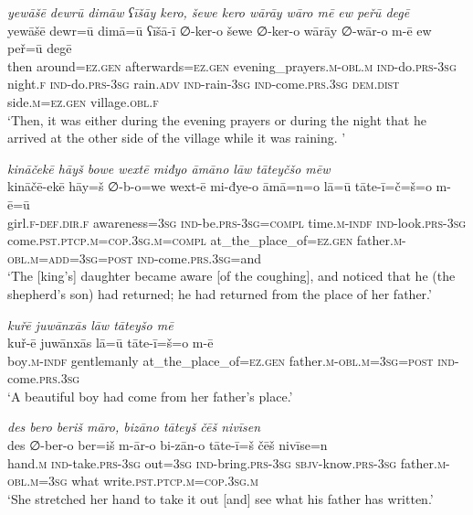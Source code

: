 \ea \label{KŠ.59}
\textit{yewāšē dewrū dimāw ʕīšāy kero, šewe kero wārāy wāro mē ew peřū degē} \\ 
\gll yewāšē dewr=ū dimā=ū ʕīšā-ī ∅-ker-o šewe ∅-ker-o wārāy ∅-wār-o m-ē ew peř=ū degē \\ 
 then around\textsc{\textsc{=ez.gen}} afterwards\textsc{\textsc{=ez.gen}} evening\_prayers\textsc{.m}\textsc{-obl}\textsc{.m} \textsc{ind-}do\textsc{.prs}\textsc{-3sg} night\textsc{.f} \textsc{ind-}do\textsc{.prs}\textsc{-3sg} rain\textsc{.adv} \textsc{ind-}rain\textsc{-3sg} \textsc{ind-}come\textsc{.prs}\textsc{.3sg} \textsc{dem.dist} side\textsc{.m}\textsc{\textsc{=ez.gen}} village\textsc{.obl}\textsc{.f} \\ 
\glt `Then, it was either during the evening prayers or during the night that he arrived at the other side of the village while it was raining. '
\z 
 
\ea \label{KŠ.65}
\textit{kināčekē hāyš bowe wextē miđyo āmāno lāw tāteyčšo mēw} \\ 
\gll kināčē-ekē hāy=š ∅-b-o=we wext-ē mi-đye-o āmā=n=o lā=ū tāte-ī=č=š=o m-ē=ū \\ 
 girl\textsc{.f}\textsc{-def}\textsc{.dir}\textsc{.f} awareness\textsc{=3sg} \textsc{ind-}be\textsc{.prs}\textsc{-3sg}\textsc{=compl} time\textsc{.m}\textsc{-indf} \textsc{ind-}look\textsc{.prs}\textsc{-3sg} come\textsc{.pst}\textsc{.ptcp}\textsc{.m}\textsc{=cop}\textsc{.3sg}\textsc{.m}\textsc{=compl} at\_the\_place\_of\textsc{\textsc{=ez.gen}} father\textsc{.m}\textsc{-obl}\textsc{.m}\textsc{=add}\textsc{=3sg}\textsc{=\textsc{post}} \textsc{ind-}come\textsc{.prs}\textsc{.3sg}=and \\ 
\glt `The [king’s] daughter became aware [of the coughing], and noticed that he (the shepherd’s son) had returned; he had returned from the place of her father.'
\z 
 
\ea \label{KŠ.68}
\textit{kuřē juwānxās lāw tāteyšo mē} \\ 
\gll kuř-ē juwānxās lā=ū tāte-ī=š=o m-ē \\ 
 boy\textsc{.m}\textsc{-indf} gentlemanly at\_the\_place\_of\textsc{\textsc{=ez.gen}} father\textsc{.m}\textsc{-obl}\textsc{.m}\textsc{=3sg}\textsc{=\textsc{post}} \textsc{ind-}come\textsc{.prs}\textsc{.3sg} \\ 
\glt `A beautiful boy had come from her father’s place.'
\z 
 
\ea \label{KŠ.71}
\textit{des bero beriš māro, bizāno tāteyš čēš nivīsen} \\ 
\gll des ∅-ber-o ber=iš m-ār-o bi-zān-o tāte-ī=š čēš nivīse=n \\ 
 hand\textsc{.m} \textsc{ind-}take\textsc{.prs}\textsc{-3sg} out\textsc{=3sg} \textsc{ind-}bring\textsc{.prs}\textsc{-3sg} \textsc{sbjv-}know\textsc{.prs}\textsc{-3sg} father\textsc{.m}\textsc{-obl}\textsc{.m}\textsc{=3sg} what write\textsc{.pst}\textsc{.ptcp}\textsc{.m}\textsc{=cop}\textsc{.3sg}\textsc{.m} \\ 
\glt `She stretched her hand to take it out [and] see what his father has written.'
\z 
 
